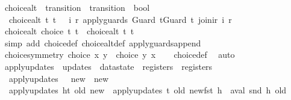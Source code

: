 \begin{isabellebody}
\isanewline
{}\isamarkupfalse%
\ choice{\isacharunderscore}alt\ {\isacharcolon}{\isacharcolon}\ {\isachardoublequoteopen}transition\ {\isasymRightarrow}\ transition\ {\isasymRightarrow}\ bool{\isachardoublequoteclose}\ \isanewline
\ \ {\isachardoublequoteopen}choice{\isacharunderscore}alt\ t\ t{\isacharprime}\ {\isacharequal}\ {\isacharparenleft}{\isasymexists}\ i\ r{\isachardot}\ apply{\isacharunderscore}guards\ {\isacharparenleft}Guard\ t{\isacharat}Guard\ t{\isacharprime}{\isacharparenright}\ {\isacharparenleft}join{\isacharunderscore}ir\ i\ r{\isacharparenright}{\isacharparenright}{\isachardoublequoteclose}\isanewline
\isanewline
{}\isamarkupfalse%
\ choice{\isacharunderscore}alt{\isacharcolon}\ {\isachardoublequoteopen}choice\ t\ t{\isacharprime}\ {\isacharequal}\ choice{\isacharunderscore}alt\ t\ t{\isacharprime}{\isachardoublequoteclose}\isanewline
%
\isadelimproof
\ \ %
\endisadelimproof
%
\isatagproof
{}\isamarkupfalse%
\ {\isacharparenleft}simp\ add{\isacharcolon}\ choice{\isacharunderscore}def\ choice{\isacharunderscore}alt{\isacharunderscore}def\ apply{\isacharunderscore}guards{\isacharunderscore}append{\isacharparenright}%
\endisatagproof
{\isafoldproof}%
%
\isadelimproof
\isanewline
%
\endisadelimproof
\isanewline
{}\isamarkupfalse%
\ choice{\isacharunderscore}symmetry{\isacharcolon}\ {\isachardoublequoteopen}choice\ x\ y\ {\isacharequal}\ choice\ y\ x{\isachardoublequoteclose}\isanewline
%
\isadelimproof
\ \ %
\endisadelimproof
%
\isatagproof
{}\isamarkupfalse%
\ choice{\isacharunderscore}def\ \isamarkupfalse%
\ auto%
\endisatagproof
{\isafoldproof}%
%
\isadelimproof
\isanewline
%
\endisadelimproof
\isanewline
{}\isamarkupfalse%
\ apply{\isacharunderscore}updates\ {\isacharcolon}{\isacharcolon}\ {\isachardoublequoteopen}updates\ {\isasymRightarrow}\ datastate\ {\isasymRightarrow}\ registers\ {\isasymRightarrow}\ registers{\isachardoublequoteclose}\ \isanewline
\ \ {\isachardoublequoteopen}apply{\isacharunderscore}updates\ {\isacharbrackleft}{\isacharbrackright}\ {\isacharunderscore}\ new\ {\isacharequal}\ new{\isachardoublequoteclose}\ {\isacharbar}\isanewline
\ \ {\isachardoublequoteopen}apply{\isacharunderscore}updates\ {\isacharparenleft}h{\isacharhash}t{\isacharparenright}\ old\ new\ {\isacharequal}\ {\isacharparenleft}apply{\isacharunderscore}updates\ t\ old\ new{\isacharparenright}{\isacharparenleft}fst\ h\ {\isachardollar}{\isacharcolon}{\isacharequal}\ aval\ {\isacharparenleft}snd\ h{\isacharparenright}\ old{\isacharparenright}{\isachardoublequoteclose}\isanewline

\end{isabellebody}

